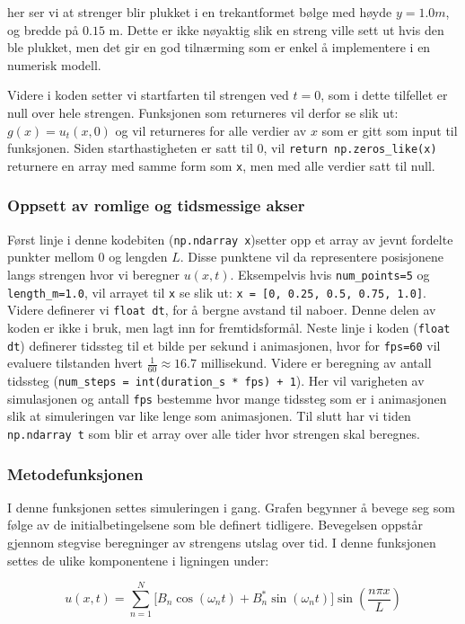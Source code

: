 her ser vi at strenger blir plukket i en trekantformet bølge med høyde $y=1.0m$, og bredde på $0.15$ m. Dette er
ikke nøyaktig slik en streng ville sett ut hvis den ble plukket, men det gir en god tilnærming som er enkel å 
implementere i en numerisk modell.

Videre i koden setter vi startfarten til strengen ved $t=0$, som i dette tilfellet er null over hele strengen. Funksjonen som returneres vil 
derfor se slik ut: $g(x)=u_t(x,0)$ og vil returneres for alle verdier av $x$ som er gitt som input til funksjonen. Siden starthastigheten er satt
til $0$, vil \verb|return np.zeros_like(x)| returnere en array med samme form som \verb|x|, men med alle verdier satt til null.

\subsubsection{Oppsett av romlige og tidsmessige akser}
Først linje i denne kodebiten (\verb|np.ndarray x|)setter opp et array av jevnt fordelte punkter mellom $0$ og lengden $L$. Disse punktene vil da representere
posisjonene langs strengen hvor vi beregner $u(x,t)$. Eksempelvis hvis \verb|num_points=5| og \verb|length_m=1.0|, vil arrayet til \verb|x| se slik ut: \verb|x = [0, 0.25, 0.5, 0.75, 1.0]|.
Videre definerer vi \verb|float dt|, for å bergne avstand til naboer. Denne delen av koden er ikke i bruk, men lagt inn for fremtidsformål. Neste 
linje i koden (\verb|float dt|) definerer tidssteg til et bilde per sekund i animasjonen, hvor for \verb|fps=60| vil evaluere tilstanden hvert
$\frac{1}{60} \approx 16.7$ millisekund. Videre er beregning av antall tidssteg (\verb|num_steps = int(duration_s * fps) + 1|). Her vil varigheten
av simulasjonen og antall \verb|fps| bestemme hvor mange tidssteg som er i animasjonen slik at simuleringen var like lenge som animasjonen. Til
slutt har vi tiden \verb|np.ndarray t| som blir et array over alle tider hvor strengen skal beregnes.

\subsubsection{Metodefunksjonen}
I denne funksjonen settes simuleringen i gang. Grafen begynner å bevege seg som følge av de initialbetingelsene som ble definert tidligere. 
Bevegelsen oppstår gjennom stegvise beregninger av strengens utslag over tid. I denne funksjonen settes de ulike komponentene i ligningen
under:

\begin{equation*}
  u(x,t) = \sum_{n=1}^{N} 
  \big[ B_n \cos(\omega_n t) + B_n^{*} \sin(\omega_n t) \big]
  \sin\!\left(\frac{n\pi x}{L}\right)
\end{equation*}

